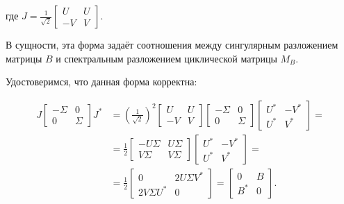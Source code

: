 где \(J= \frac{1}{\sqrt{2}}\begin{bmatrix}
    U & U \\
    -V & V
\end{bmatrix}\).

В сущности, эта форма задаёт соотношения между сингулярным разложением матрицы \(B\) и спектральным разложением циклической матрицы \(M_B\).

Удостоверимся, что данная форма корректна:

\begin{equation*}
    \begin{split}
        J \begin{bmatrix} -\Sigma & 0 \\ 0 & \Sigma \end{bmatrix} J^* 
        &= \left( \frac{1}{\sqrt{2}}\right)^2 
            \begin{bmatrix} U & U \\ -V & V \end{bmatrix}
            \begin{bmatrix} -\Sigma & 0 \\ 0 & \Sigma \end{bmatrix}
            \begin{bmatrix} U^* & -V^* \\ U^* & V^* \end{bmatrix}= \\[6pt]
        &= \frac{1}{2} 
            \begin{bmatrix} -U\Sigma & U\Sigma \\ V\Sigma & V\Sigma \end{bmatrix}
            \begin{bmatrix} U^* & -V^* \\ U^* & V^* \end{bmatrix}=\\[6pt] 
        &= \frac{1}{2} 
            \begin{bmatrix} 0 & 2 U\Sigma V^* \\ 2 V\Sigma U^* & 0 \end{bmatrix} = \begin{bmatrix} 0 & B \\ B^* & 0 \end{bmatrix}.
    \end{split}
\end{equation*}

